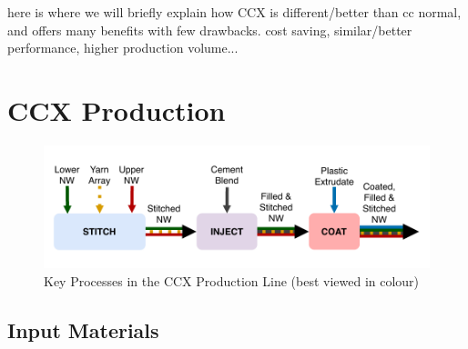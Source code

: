 \documentclass[12pt]{report}
\begin{document}
    here is where we will briefly explain how CCX is different/better than cc normal, and offers many benefits with few drawbacks. cost saving, similar/better performance, higher production volume...
    \pagebreak
    \section{CCX Production}
            
        \begin{figure}
            \centering
            \includegraphics[width=\textwidth]{figures/background/process_flow_overview.pdf}
            \caption{Key Processes in the CCX Production Line (best viewed in colour)}
            \label{fig:process_flow_overview}
        \end{figure}
        
    \subsection{Input Materials}
\end{document}
